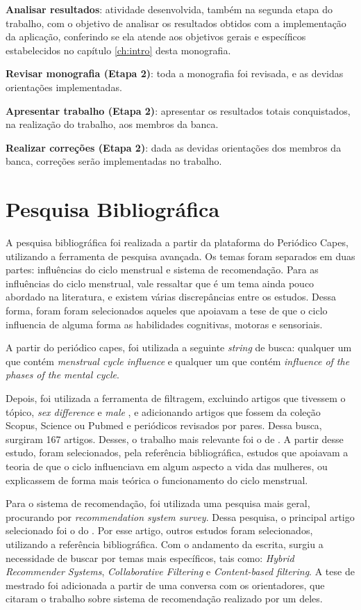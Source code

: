 \textbf{Analisar resultados}: atividade desenvolvida, também na segunda etapa do trabalho, 
com o objetivo de
analisar os resultados obtidos com a implementação da aplicação, conferindo se ela atende 
aos objetivos gerais e específicos estabelecidos no capítulo \ref{ch:intro} desta monografia.

\textbf{Revisar monografia (Etapa 2)}: toda a monografia foi revisada, e as devidas orientações implementadas.
 
\textbf{Apresentar trabalho (Etapa 2)}: apresentar os resultados totais conquistados, na 
realização do trabalho, aos membros da banca.

\textbf{Realizar correções (Etapa 2)}: dada as devidas orientações dos membros da banca, correções 
serão implementadas no trabalho.

\section{Pesquisa Bibliográfica}

A pesquisa bibliográfica foi realizada a partir da plataforma do Periódico Capes, utilizando a ferramenta de pesquisa avançada.
Os temas foram separados em duas partes: influências do ciclo menstrual e sistema de recomendação.
Para as influências do ciclo menstrual, vale ressaltar que é um tema ainda pouco abordado na literatura, e existem 
várias discrepâncias entre os estudos. Dessa forma, foram foram selecionados aqueles que apoiavam a tese de que 
o ciclo influencia de alguma forma as habilidades cognitivas, motoras e sensoriais. 

A partir do periódico capes, foi utilizada a seguinte \emph{string} de busca:
qualquer um que contém \emph{menstrual cycle influence} e qualquer um que contém 
\emph{influence of the phases of the mental cycle}. 

Depois, foi utilizada a ferramenta de filtragem, excluindo artigos que tivessem o tópico, \emph{sex difference} e \emph{male}
, e adicionando artigos que fossem da coleção Scopus, Science ou Pubmed e periódicos revisados por pares. Dessa busca, surgiram 167 artigos.
Desses, o trabalho mais relevante foi o de . A partir desse estudo, foram selecionados, pela referência bibliográfica, estudos que apoiavam 
a teoria de que o ciclo influenciava em algum aspecto a vida das mulheres, ou explicassem de forma mais teórica o funcionamento do ciclo menstrual.


Para o sistema de recomendação, foi utilizada uma pesquisa mais geral, procurando por \emph{recommendation system survey}. Dessa pesquisa, o principal artigo selecionado foi o 
do . Por esse artigo, outros estudos foram selecionados, utilizando a referência bibliográfica. Com o andamento da escrita, surgiu a necessidade de buscar
por temas mais específicos, tais como: \emph{Hybrid Recommender Systems}, \emph{Collaborative Filtering} e \emph{Content-based filtering}. A tese de mestrado \cite{mauricio} foi adicionada a partir 
de uma conversa com os orientadores, que citaram o trabalho sobre sistema de recomendação realizado por um deles.


